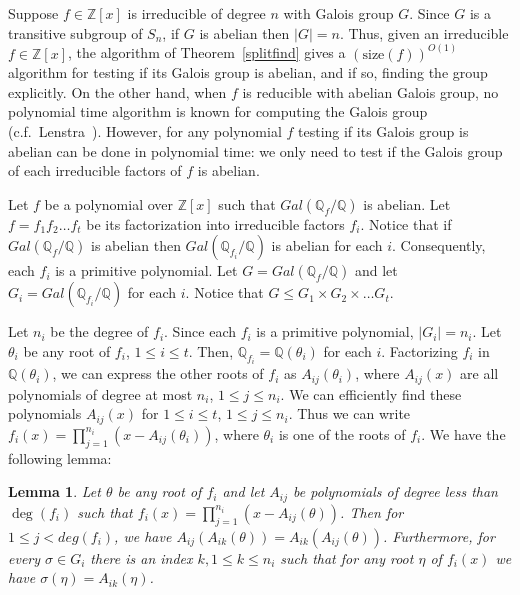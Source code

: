 \documentclass{article}
\newtheorem{lemma}[theorem]{Lemma}
\newcommand{\Gal}[1]{\ensuremath{Gal\left(#1\right)}}
\newcommand{\Q}[0]{\ensuremath{\mathbb{Q}}}
\newcommand{\Z}[0]{\ensuremath{\mathbb{Z}}}
\newcommand{\size}[0]{\ensuremath{\mathrm{size}}}
\begin{document}
Suppose $f\in\Z[x]$ is irreducible of degree $n$ with Galois group
$G$. Since $G$ is a transitive subgroup of $S_n$, if $G$ is abelian
then $|G|=n$. Thus, given an irreducible $f\in\Z[x]$, the algorithm of
Theorem~\ref{splitfind} gives a $(\size(f))^{O(1)}$ algorithm for
testing if its Galois group is abelian, and if so, finding the group
explicitly. On the other hand, when $f$ is reducible with abelian
Galois group, no polynomial time algorithm is known for computing the
Galois group (c.f.\ Lenstra~\cite{lenstra:1992:algorithm}). However,
for any polynomial $f$ testing if its Galois group is abelian can be
done in polynomial time: we only need to test if the Galois group of
each irreducible factors of $f$ is abelian.

Let $f$ be a polynomial over $\Z[x]$ such that $\Gal{\Q_f/\Q}$ is
abelian. Let $f = f_1 f_2 \ldots f_t$ be its factorization into
irreducible factors $f_i$. Notice that if $\Gal{\Q_f/\Q}$ is abelian
then $\Gal{\Q_{f_i}/\Q}$ is abelian for each $i$. Consequently, each
$f_i$ is a primitive polynomial. Let $G = \Gal{\Q_f/\Q}$ and let $G_i
= \Gal{\Q_{f_i}/\Q}$ for each $i$.  Notice that $G \leq G_1 \times G_2
\times \ldots G_t$.

Let $n_i$ be the degree of $f_i$. Since each $f_i$ is a primitive
polynomial, $|G_i| = n_i$. Let $\theta_i$ be any root of $f_i$, $1\leq
i\leq t$. Then, $\Q_{f_i}=\Q(\theta_i)$ for each $i$. Factorizing
$f_i$ in $\Q(\theta_i)$, we can express the other roots of $f_i$ as
$A_{ij}(\theta_i)$, where $A_{ij}(x)$ are all polynomials of degree at
most $n_i$, $1\leq j\leq n_i$. We can efficiently find these
polynomials $A_{ij}(x)$ for $1 \leq i \leq t$, $1\leq j\leq n_i$. Thus
we can write $f_i(x) = \prod_{j=1}^{n_i} \left( x - A_{ij}(\theta_i)
\right)$, where $\theta_i$ is one of the roots of $f_i$. We have the
following lemma:

\begin{lemma}\label{abel}
  Let $\theta$ be any root of $f_i$ and let $A_{ij}$ be polynomials of
  degree less than $\deg(f_i)$ such that $f_i(x) = \prod_{j=1}^{n_i}
  ( x - A_{ij}(\theta))$. Then for $1 \leq j < deg(f_i)$,
  we have $A_{ij}(A_{ik}(\theta)) =
  A_{ik}(A_{ij}(\theta))$. Furthermore, for every $\sigma
  \in G_i$ there is an index $k, 1\leq k\leq n_i$ such that for any
  root $\eta$ of $f_i(x)$ we have $\sigma(\eta) = A_{ik}(\eta)$.
\end{lemma}
\end{document}

